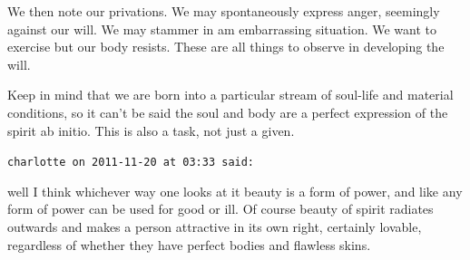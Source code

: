 \begin{footnotesize}
\begin{sffamily}
We then note our privations. We may spontaneously express anger, seemingly against our will. We may stammer in am embarrassing situation. We want to exercise but our body resists. These are all things to observe in developing the will.

Keep in mind that we are born into a particular stream of soul-life and material conditions, so it can't be said the soul and body are a perfect expression of the spirit ab initio. This is also a task, not just a given.


\hfill

\texttt{charlotte on 2011-11-20 at 03:33 said: }

well I think whichever way one looks at it beauty is a form of power, and like any form of power can be used for good or ill. Of course beauty of spirit radiates outwards and makes a person attractive in its own right, certainly lovable, regardless of whether they have perfect bodies and flawless skins.


\end{sffamily}\end{footnotesize}
